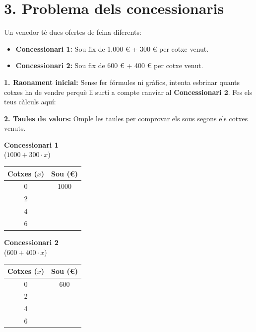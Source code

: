 \documentclass[12pt,a4paper]{article}
\begin{document}
\section*{3. Problema dels concessionaris}
Un venedor té dues ofertes de feina diferents:
\begin{itemize}
    \item \textbf{Concessionari 1:} Sou fix de 1.000 € + 300 € per cotxe venut.
    \item \textbf{Concessionari 2:} Sou fix de 600 € + 400 € per cotxe venut.
\end{itemize}

\textbf{1. Raonament inicial:}
Sense fer fórmules ni gràfics, intenta esbrinar quants cotxes ha de vendre perquè li surti a compte canviar al \textbf{Concessionari 2}. Fes els teus càlculs aquí:
\vspace{3cm}

\textbf{2. Taules de valors:}
Omple les taules per comprovar els sous segons els cotxes venuts.

\noindent
\begin{minipage}[t]{0.48\textwidth}
    \centering
    \textbf{Concessionari 1} \\ ($1000 + 300 \cdot x$)
    \vspace{0.1cm}
    
    \renewcommand{\arraystretch}{1.5}
    \begin{tabular}{|c|c|}
        \hline \textbf{Cotxes ($x$)} & \textbf{Sou (€)} \\ \hline
        0 & 1000 \\ \hline
        2 & \\ \hline
        4 & \\ \hline
        6 & \\ \hline
    \end{tabular}
\end{minipage}
\hfill
\begin{minipage}[t]{0.48\textwidth}
    \centering
    \textbf{Concessionari 2} \\ ($600 + 400 \cdot x$)
    \vspace{0.1cm}
    
    \renewcommand{\arraystretch}{1.5}
    \begin{tabular}{|c|c|}
        \hline \textbf{Cotxes ($x$)} & \textbf{Sou (€)} \\ \hline
        0 & 600 \\ \hline
        2 & \\ \hline
        4 & \\ \hline
        6 & \\ \hline
    \end{tabular}
\end{minipage}
\end{document}
